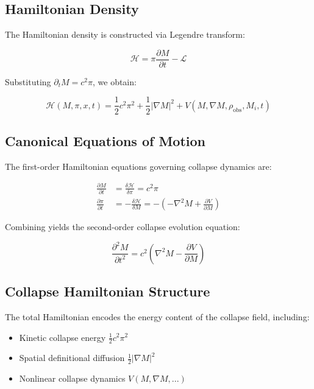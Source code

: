 \subsection{Hamiltonian Density}

The Hamiltonian density is constructed via Legendre transform:

\begin{equation}
\mathcal{H} = \pi \frac{\partial M}{\partial t} - \mathcal{L}
\end{equation}

Substituting \( \partial_t M = c^2 \pi \), we obtain:

\begin{equation}
\mathcal{H}(M, \pi, x, t) = \frac{1}{2} c^2 \pi^2 + \frac{1}{2} |\nabla M|^2 + V(M, \nabla M, \rho_{\text{obs}}, M_i, t)
\end{equation}

\subsection{Canonical Equations of Motion}

The first-order Hamiltonian equations governing collapse dynamics are:

\begin{align}
\frac{\partial M}{\partial t} &= \frac{\delta \mathcal{H}}{\delta \pi} = c^2 \pi \\
\frac{\partial \pi}{\partial t} &= - \frac{\delta \mathcal{H}}{\delta M} = - \left( -\nabla^2 M + \frac{\partial V}{\partial M} \right)
\end{align}

Combining yields the second-order collapse evolution equation:

\begin{equation}
\frac{\partial^2 M}{\partial t^2} = c^2 \left( \nabla^2 M - \frac{\partial V}{\partial M} \right)
\end{equation}

\subsection{Collapse Hamiltonian Structure}

The total Hamiltonian encodes the energy content of the collapse field, including:

\begin{itemize}
  \item Kinetic collapse energy \( \frac{1}{2} c^2 \pi^2 \)
  \item Spatial definitional diffusion \( \frac{1}{2} |\nabla M|^2 \)
  \item Nonlinear collapse dynamics \( V(M, \nabla M, ...) \)
\end{itemize}

